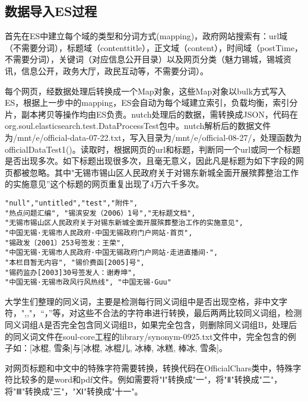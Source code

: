 \subsection{数据导入ES过程}
\par 首先在ES中建立每个域的类型和分词方式(mapping)，政府网站搜索有：url域（不需要分词），标题域（contenttitle），正文域（content），时间域（postTime，不需要分词），关键词（对应信息公开目录）以及网页分类（魅力锡城，锡城资讯，信息公开，政务大厅，政民互动等，不需要分词）。
\par 每个网页，经数据处理后转换成一个Map对象，这些Map对象以bulk方式写入ES，根据上一步中的mapping，ES会自动为每个域建立索引，负载均衡，索引分片，副本拷贝等操作均由ES负责。nutch处理后的数据，需转换成JSON，代码在org.soul.elasticsearch.test.DataProcessTest包中。nutch解析后的数据文件为/mnt/e/official-data-07-22.txt，写入目录为/mnt/e/official-08-27/，处理函数为officialDataTest1()。读取时，根据网页的url和标题，判断同一个url或同一个标题是否出现多次。如下标题出现很多次，且毫无意义，因此凡是标题为如下字段的网页都被忽略。其中"无锡市锡山区人民政府关于对锡东新城全面开展殡葬整治工作的实施意见”这个标题的网页重复出现了4万六千多次。
\begin{verbatim}
"null","untitled","test","附件",
"热点问题汇编", "锡滨安发（2006）1号","无标题文档",
"无锡市锡山区人民政府关于对锡东新城全面开展殡葬整治工作的实施意见",
"中国无锡·无锡市人民政府·中国无锡政府门户网站·首页", 
"锡政发〔2001〕253号签发：王荣",
"中国无锡·无锡市人民政府·中国无锡政府门户网站·走进直播间·", 
"本栏目暂无内容", "锡价费函[2005]号", 
"锡药监办[2003]30号签发人：谢寿坤",
"中国无锡·无锡市政风行风热线", "中国无锡·Guu" 
\end{verbatim}
\par 大学生们整理的同义词，主要是检测每行同义词组中是否出现空格，非中文字符，",,"，“，”等，对这些不合法的字符串进行转换，最后两两比较同义词组，检测同义词组A是否完全包含同义词组B，如果完全包含，则删除同义词组B，处理后的同义词文件在soul-core工程的library/synonym-0925.txt文件中，完全包含的例子如：[冰棍, 雪条]与[冰棍, 冰棍儿, 冰棒, 冰糕, 棒冰, 雪条]。
\par 对网页标题和中文中的特殊字符需要转换，转换代码在OfficialChars类中，特殊字符比较多的是word和pdf文件。例如需要将"Ⅰ"转换成"一"，将"Ⅱ"转换成"二"，将"Ⅲ"转换成"三"，"Ⅺ"转换成"十一"。
